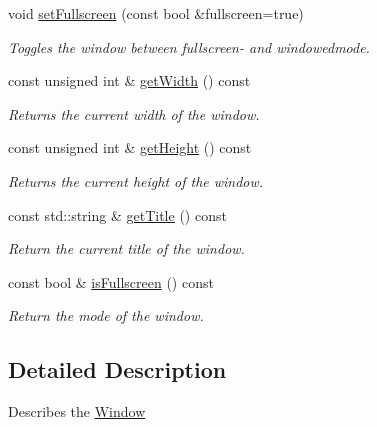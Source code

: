 \begin{DoxyCompactItemize}
void \hyperlink{classburn_1_1_window_settings_a40cbbd8c1fe6303176f947c75a49368a}{set\-Fullscreen} (const bool \&fullscreen=true)
\begin{DoxyCompactList}\small\item\em Toggles the window between fullscreen-\/ and windowedmode. \end{DoxyCompactList}\item 
const unsigned int \& \hyperlink{classburn_1_1_window_settings_a52ab177b1d13ce1a3623f093d0a59b96}{get\-Width} () const 
\begin{DoxyCompactList}\small\item\em Returns the current width of the window. \end{DoxyCompactList}\item 
const unsigned int \& \hyperlink{classburn_1_1_window_settings_a9cca56ebd1c101ccd470989a7b472378}{get\-Height} () const 
\begin{DoxyCompactList}\small\item\em Returns the current height of the window. \end{DoxyCompactList}\item 
const std\-::string \& \hyperlink{classburn_1_1_window_settings_ab0e0c2ae932c94deda5d7523d9dc5a77}{get\-Title} () const 
\begin{DoxyCompactList}\small\item\em Return the current title of the window. \end{DoxyCompactList}\item 
const bool \& \hyperlink{classburn_1_1_window_settings_a9d142978442ffa08540b348fe62ecca1}{is\-Fullscreen} () const 
\begin{DoxyCompactList}\small\item\em Return the mode of the window. \end{DoxyCompactList}\end{DoxyCompactItemize}


\subsection{Detailed Description}
Describes the \hyperlink{classburn_1_1_window}{Window} 

